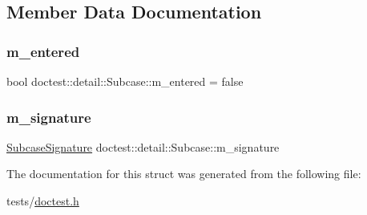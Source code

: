 \subsection{Member Data Documentation}
\mbox{\label{structdoctest_1_1detail_1_1Subcase_acb703ee6e769f56fba4053447c1a36e4}} 
\subsubsection{\texorpdfstring{m\+\_\+entered}{m\_entered}}
{\footnotesize\ttfamily bool doctest\+::detail\+::\+Subcase\+::m\+\_\+entered = false}

\mbox{\label{structdoctest_1_1detail_1_1Subcase_a54730e9b88cf33ea4a5c873164029202}} 
\subsubsection{\texorpdfstring{m\+\_\+signature}{m\_signature}}
{\footnotesize\ttfamily \hyperlink{structdoctest_1_1SubcaseSignature}{Subcase\+Signature} doctest\+::detail\+::\+Subcase\+::m\+\_\+signature}



The documentation for this struct was generated from the following file\+:\begin{DoxyCompactItemize}
\item 
tests/\hyperlink{doctest_8h}{doctest.\+h}\end{DoxyCompactItemize}
